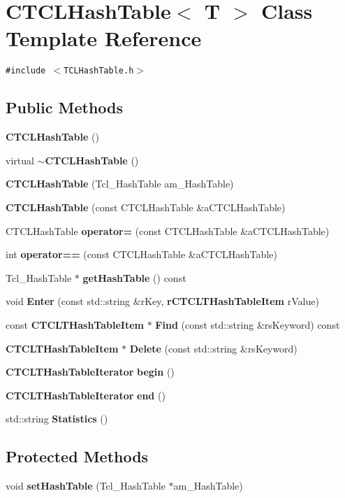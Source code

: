 \section{CTCLHash\-Table$<$ T $>$  Class Template Reference}
\label{classCTCLHashTable}
{\tt \#include $<$TCLHash\-Table.h$>$}

\subsection*{Public Methods}
\begin{CompactItemize}
\item 
{\bf CTCLHash\-Table} ()
\item 
virtual {\bf $\sim$CTCLHash\-Table} ()
\item 
{\bf CTCLHash\-Table} (Tcl\_\-Hash\-Table am\_\-Hash\-Table)
\item 
{\bf CTCLHash\-Table} (const CTCLHash\-Table \&a\-CTCLHash\-Table)
\item 
CTCLHash\-Table {\bf operator=} (const CTCLHash\-Table \&a\-CTCLHash\-Table)
\item 
int {\bf operator==} (const CTCLHash\-Table \&a\-CTCLHash\-Table)
\item 
Tcl\_\-Hash\-Table $\ast$ {\bf get\-Hash\-Table} () const
\item 
void {\bf Enter} (const std::string \&r\-Key, {\bf r\-CTCLTHash\-Table\-Item} r\-Value)
\item 
const {\bf CTCLTHash\-Table\-Item} $\ast$ {\bf Find} (const std::string \&rs\-Keyword) const
\item 
{\bf CTCLTHash\-Table\-Item} $\ast$ {\bf Delete} (const std::string \&rs\-Keyword)
\item 
{\bf CTCLTHash\-Table\-Iterator} {\bf begin} ()
\item 
{\bf CTCLTHash\-Table\-Iterator} {\bf end} ()
\item 
std::string {\bf Statistics} ()
\end{CompactItemize}
\subsection*{Protected Methods}
\begin{CompactItemize}
\item 
void {\bf set\-Hash\-Table} (Tcl\_\-Hash\-Table $\ast$am\_\-Hash\-Table)
\end{CompactItemize}

